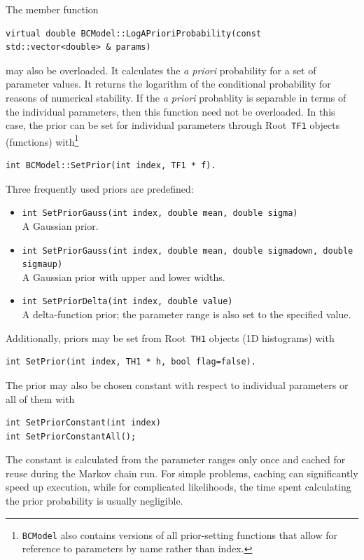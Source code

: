 \documentclass[11pt, a4paper]{article}
\newcommand{\Root}{{\sc Root}}
\newcommand{\code}[1]{\texttt{#1}}
\begin{document}
The member function
%
\begin{verbatim}
virtual double BCModel::LogAPrioriProbability(const std::vector<double> & params)
\end{verbatim}
%
may also be overloaded. It calculates the {\it a priori} probability
for a set of parameter values. It returns the logarithm of the
conditional probability for reasons of numerical stability. If the
{\it a priori} probablity is separable in terms of the individual
parameters, then this function need not be overloaded.  In this case,
the prior can be set for individual parameters through \Root\
\verb|TF1| objects (functions) with\footnote{\code{BCModel} also
  contains versions of all prior-setting functions that allow for
  reference to parameters by name rather than index.}
%
\begin{verbatim}
int BCModel::SetPrior(int index, TF1 * f).
\end{verbatim}
%
Three frequently used priors are predefined:
%
\begin{itemize}
\item \code{int SetPriorGauss(int index, double mean, double sigma)}\\
  A Gaussian prior.

\item \code{int SetPriorGauss(int index, double mean, double sigmadown, double sigmaup)}\\
  A Gaussian prior with upper and lower widths.

\item \code{int SetPriorDelta(int index, double value)}\\
  A delta-function prior; the parameter range is also set to the
  specified value.
\end{itemize}

Additionally, priors may be set from \Root\ \code{TH1} objects (1D
histograms) with
\begin{verbatim}
int SetPrior(int index, TH1 * h, bool flag=false).
\end{verbatim}
%

The prior may also be chosen constant with respect to individual
parameters or all of them with
%
\begin{verbatim}
int SetPriorConstant(int index)
int SetPriorConstantAll();
\end{verbatim}
%
The constant is calculated from the parameter ranges only once and
cached for reuse during the Markov chain run. For simple problems,
caching can significantly speed up execution, while for complicated
likelihoods, the time spent calculating the prior probability is
usually negligible.
\end{document}
